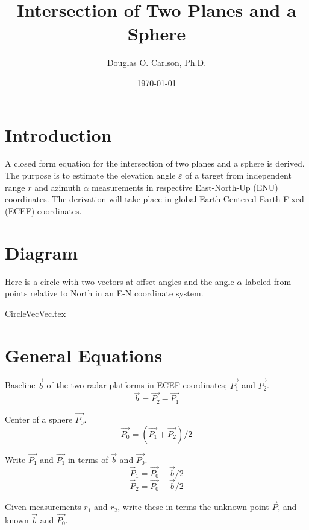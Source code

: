 \documentclass[12pt]{article}
\title{\textbf{Intersection of Two Planes and a Sphere}}
\author{Douglas O. Carlson, Ph.D.}
\date{\today}
\begin{document}
	\maketitle
	
	\section{Introduction}
	A closed form equation for the intersection of two planes and a sphere is derived. The purpose is to estimate the elevation angle $\varepsilon$	of a target from independent range $r$ and azimuth $\alpha$ measurements in respective East-North-Up (ENU) coordinates. The derivation will take place in global Earth-Centered Earth-Fixed (ECEF) coordinates.
	
	\section{Diagram}
	Here is a circle with two vectors at offset angles and the angle $\alpha$ labeled from points relative to North in an E-N coordinate system.
	
	\begin{center}
		{CircleVecVec.tex}
	\end{center}
	
	\section{General Equations}
	Baseline $\vec{b}$ of the two radar platforms in ECEF coordinates; $\vec{P_1}$ and $\vec{P_2}$.
	\begin{equation}
		\vec{b} = \vec{P_2} - \vec{P_1}
	\end{equation}

	Center of a sphere $\vec{P_0}$.
	\begin{equation}
		\vec{P_0} = (\vec{P_1} + \vec{P_2})/2
	\end{equation}
	
	Write $\vec{P_1}$ and $\vec{P_1}$ in terms of $\vec{b}$ and $\vec{P_0}$.
	\begin{equation}
		\vec{P}_1 = \vec{P_0} - \vec{b} / 2
	\end{equation}	
	\begin{equation}
		\vec{P}_2 = \vec{P_0} + \vec{b} / 2
	\end{equation}	
	
	Given measurements $r_1$ and $r_2$, write these in terms the unknown point 
	$\vec{P}$, and known $\vec{b}$ and $\vec{P_0}$.
	
\end{document}
